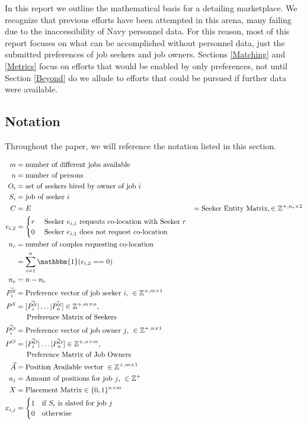 In this report we outline the mathematical basis for a detailing marketplace. We recognize that previous efforts have been attempted in this arena, many failing due to the inaccessibility of Navy personnel data. For this reason, most of this report focuses on what can be accomplished without personnel data, just the submitted preferences of job seekers and job owners.  Sections \ref{Matching} and \ref{Metrics} focus on efforts that would be enabled by only preferences, not until Section \ref{Beyond} do we allude to efforts that could be pursued if further data were available.

\subsection{Notation}

Throughout the paper, we will reference the notation listed in this section.

\begin{align}
m &= \text{number of different jobs available}\\
n &= \text{number of persons}\\
O_i &= \text{set of seekers hired by owner of job $i$} \\
S_i &= \text{job of seeker $i$} \\
C &= 
E &= \text{Seeker Entity Matrix}, \in \mathbb{Z}^{+, n_e \times 2}\\
e_{i,2} &= \begin{cases}
r & \text{ Seeker $e_{i,1}$ requests co-location with Seeker $r$} \\
0 & \text{ Seeker $e_{i,1}$ does not request co-location}
\end{cases} \\
n_c &= \text{number of couples requesting co-location}\\
&= \sum_{i=1}^n\mathbbm{1}(e_{i,2} == 0) \\
n_e &= n - n_c \\
\vec{P^S_i} &= \text{Preference vector of job seeker $i$, } \in \mathbb{Z}^{+, m \times 1} \\
P^S &= [\vec{P^S_i} | \dots | \vec{P^S_n}] \in \mathbb{Z}^{+, m \times n}, \\ 
&\text{\indent Preference Matrix of Seekers} \\
\vec{P^O_i} &= \text{Preference vector of job owner $j$, } \in \mathbb{Z}^{+, n \times 1} \\
P^O &= [\vec{P^O_i} | \dots | \vec{P^O_n}] \in \mathbb{Z}^{+, n \times m}, \\ 
&\text{\indent Preference Matrix of Job Owners} \\
\vec{A} &= \text{Position Available vector }\in \mathbb{Z}^{+, m \times 1} \\
a_j &= \text{Amount of positions for job $j$, } \in \mathbb{Z}^{+} \\
X &= \text{Placement Matrix} \in \{0,1\}^{n \times m} \\
x_{i,j} &= \begin{cases}
1 & \text{if $S_i$ is slated for job $j$}\\
0 & \text{otherwise}
\end{cases}
\end{align}


